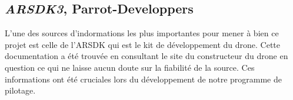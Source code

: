 \subsection{\textit{ARSDK3}, Parrot-Developpers}
L'une des sources d'indormations les plus importantes pour mener à bien ce projet est celle de l'ARSDK qui est le kit de développement du drone. Cette documentation a été trouvée en consultant le site du constructeur du drone en question ce qui ne laisse aucun doute sur la fiabilité de la source. Ces informations ont été cruciales lors du développement de notre programme de pilotage.